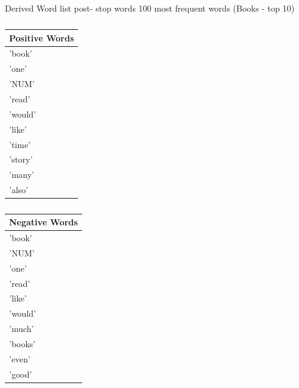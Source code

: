 \documentclass{llncs}
\begin{document}
\begin{center}
    \begin{table}
    \caption{Derived Word list post- stop words 100 most frequent words (Books - top 10)}
    \begin{minipage}{.5\linewidth}
    \caption{}
    \centering
    \begin{tabular}{| l |}
        \hline
        Positive Words \\ \hline
        'book'\\ \hline
        'one'\\ \hline
        'NUM'\\ \hline
        'read'\\ \hline
        'would'\\ \hline
        'like'\\ \hline
        'time'\\ \hline
        'story'\\ \hline
        'many'\\ \hline
        'also'\\ \hline
    \end{tabular}
    \end{minipage}%
    \begin{minipage}{.5\linewidth}
    \centering
    \caption{}
    \begin{tabular}{| l |}
        \hline
        Negative Words \\ \hline
        'book' \\ \hline
        'NUM' \\ \hline
        'one' \\ \hline
        'read' \\ \hline
        'like' \\ \hline
        'would' \\ \hline
        'much' \\ \hline
        'books' \\ \hline
        'even' \\ \hline
        'good' \\ \hline
    \end{tabular}
    \end{minipage} 
    \end{table}
\end{center}
\end{document}
